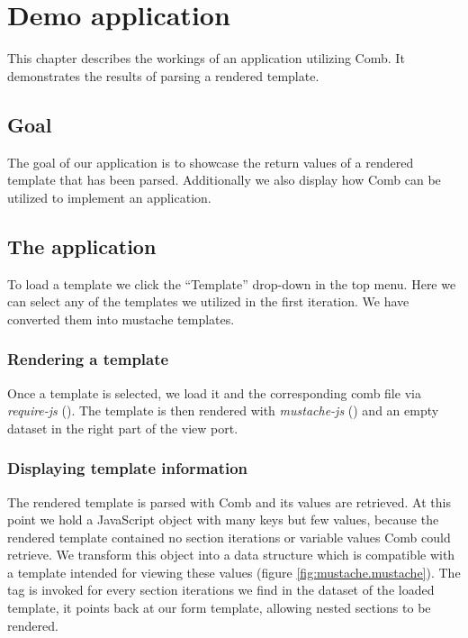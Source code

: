 \documentclass[thesis.tex]{subfiles}
\begin{document}
\chapter{Demo application}
\label{chap:demo}
This chapter describes the workings of an application utilizing Comb.
It demonstrates the results of parsing a rendered template.


\section{Goal}
The goal of our application is to showcase the return values of a
rendered template that has been parsed.
Additionally we also display how Comb can be utilized to implement an
application.

\section{The application}
To load a template we click the ``Template'' drop-down in the top menu.
Here we can select any of the templates we utilized in the first iteration.
We have converted them into mustache templates.

\subsection{Rendering a template}
Once a template is selected, we load it and the corresponding comb file via
\emph{require-js} (). The template is then rendered with
\emph{mustache-js} () and an empty dataset in the right part of the view port.

\subsection{Displaying template information}
The rendered template is parsed with Comb and its values are retrieved.
At this point we hold a JavaScript object with many keys but few values,
because the rendered template contained no section iterations or variable values
Comb could retrieve. We transform this object into a data structure which is
compatible with a template intended for viewing these values
(figure \ref{fig:mustache.mustache}).
The  tag is invoked for every section iterations we
find in the dataset of the loaded template, it points back at our form template,
allowing nested sections to be rendered.
\end{document}
